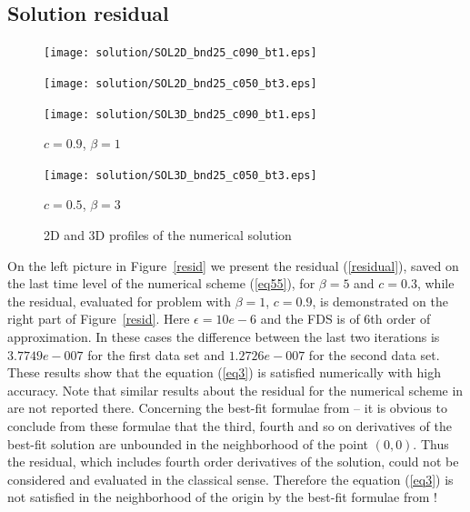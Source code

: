 \documentclass[preprint]{elsarticle}
\newcommand{\rf}[1]{(\ref{#1})}
\begin{document}
\subsection{Solution residual}

\begin{figure}[ht]
	\begin{minipage}[b]{0.5\linewidth}
		\raggedleft
		\texttt{[image: solution/SOL2D\_bnd25\_c090\_bt1.eps]}
	\end{minipage}
	\begin{minipage}[b]{0.5\linewidth}
		\raggedright
		\texttt{[image: solution/SOL2D\_bnd25\_c050\_bt3.eps]}
	\end{minipage}
	\begin{minipage}[b]{0.45\linewidth}
		 \raggedleft
		\texttt{[image: solution/SOL3D\_bnd25\_c090\_bt1.eps]}
		\centerline{$c = 0.9$, $\beta = 1$}
	\end{minipage}
	\begin{minipage}[b]{0.5\linewidth}
		 \raggedright
		\texttt{[image: solution/SOL3D\_bnd25\_c050\_bt3.eps]}
		\centerline{$c = 0.5$, $\beta = 3$}
	\end{minipage}
	\caption{2D and 3D profiles of the numerical solution}
	\label{fig:solutions}
\end{figure}
On the left picture in Figure~\ref{resid} we present  the residual \rf{residual}, saved on the last time level of the numerical scheme \rf{eq55},  for $\beta = 5$ and $c = 0.3$, while the residual, evaluated for problem with $\beta = 1$, $c = 0.9$, is demonstrated on the right part of Figure~\ref{resid}. Here  $\epsilon =10e-6$ and the FDS is of 6th order of approximation. In these cases the difference between the last two iterations is $3.7749e-007$ for the first data set and $1.2726e-007$ for the second data set. These results show that the  equation \rf{eq3} is satisfied numerically with high accuracy. 
Note that similar results about the residual for the numerical scheme in \cite{Ch2012} are not reported there. Concerning the best-fit formulae from \cite{Ch2011} -- it is obvious to conclude from these formulae that the third, fourth and so on  derivatives of the best-fit solution are unbounded in the neighborhood of the point $(0,0)$. Thus  
the residual, which includes fourth order derivatives of the solution, could not be considered and evaluated in the classical sense. Therefore the equation \rf{eq3} is not satisfied in the neighborhood of the origin by the best-fit formulae  from \cite{Ch2011}!
\end{document}
